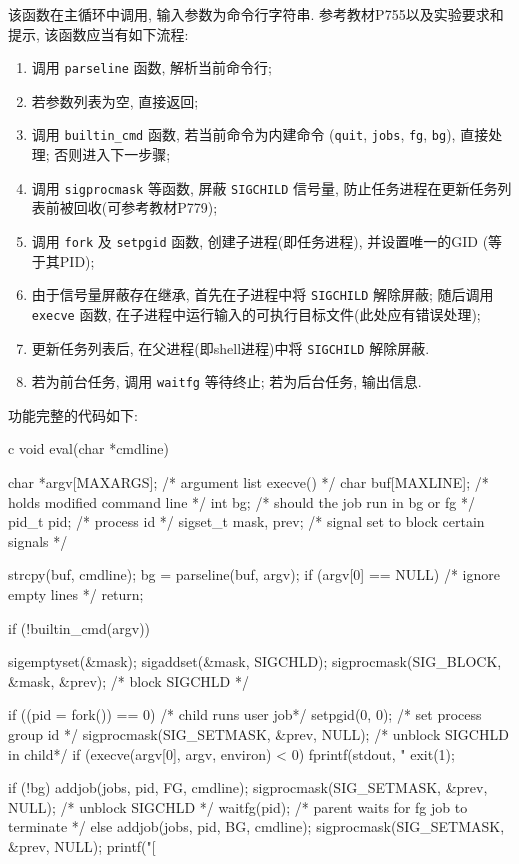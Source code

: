 该函数在主循环中调用, 输入参数为命令行字符串. 参考教材P755以及实验要求和提示, 该函数应当有如下流程:
\begin{enumerate}
  \item 调用 \verb|parseline| 函数, 解析当前命令行;
  \item 若参数列表为空, 直接返回;
  \item 调用 \verb|builtin_cmd| 函数, 若当前命令为内建命令 (\verb|quit|, \verb|jobs|, \verb|fg|, \verb|bg|), 直接处理; 否则进入下一步骤;
  \item 调用 \verb|sigprocmask| 等函数, 屏蔽 \verb|SIGCHILD| 信号量, 防止任务进程在更新任务列表前被回收(可参考教材P779);
  \item 调用 \verb|fork| 及 \verb|setpgid| 函数, 创建子进程(即任务进程), 并设置唯一的GID (等于其PID);
  \item 由于信号量屏蔽存在继承, 首先在子进程中将 \verb|SIGCHILD| 解除屏蔽; 随后调用 \verb|execve| 函数, 在子进程中运行输入的可执行目标文件(此处应有错误处理);
  \item 更新任务列表后, 在父进程(即shell进程)中将 \verb|SIGCHILD| 解除屏蔽.
  \item 若为前台任务, 调用 \verb|waitfg| 等待终止; 若为后台任务, 输出信息.
\end{enumerate}

功能完整的代码如下:
\begin{code}{c}
void eval(char *cmdline) {
  char *argv[MAXARGS]; /* argument list execve() */
  char buf[MAXLINE];   /* holds modified command line */
  int bg;              /* should the job run in bg or fg */
  pid_t pid;           /* process id */
  sigset_t mask, prev; /* signal set to block certain signals */

  strcpy(buf, cmdline);
  bg = parseline(buf, argv);
  if (argv[0] == NULL) /* ignore empty lines */
    return;

  if (!builtin_cmd(argv)) {
    sigemptyset(&mask);
    sigaddset(&mask, SIGCHLD);
    sigprocmask(SIG_BLOCK, &mask, &prev); /* block SIGCHLD */

    if ((pid = fork()) == 0) {               /* child runs user job*/
      setpgid(0, 0);                         /* set process group id */
      sigprocmask(SIG_SETMASK, &prev, NULL); /* unblock SIGCHLD in child*/
      if (execve(argv[0], argv, environ) < 0) {
        fprintf(stdout, "%
        exit(1);
      }
    }

    if (!bg) {
      addjob(jobs, pid, FG, cmdline);
      sigprocmask(SIG_SETMASK, &prev, NULL); /* unblock SIGCHLD */
      waitfg(pid); /* parent waits for fg job to terminate */
    } else {
      addjob(jobs, pid, BG, cmdline);
      sigprocmask(SIG_SETMASK, &prev, NULL);
      printf("[%
    }
  }
}
\end{code}

